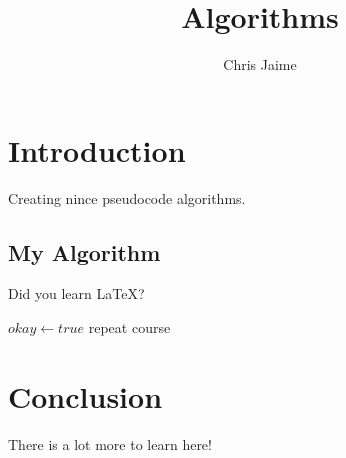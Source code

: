 \documentclass{article}
\title{Algorithms}
\author{Chris Jaime}
\date{}
\begin{document}
\maketitle

\section{Introduction}
Creating nince pseudocode algorithms.

\subsection{My Algorithm}
Did you learn \LaTeX?

\begin{algorithmic}
	\State $okay \gets true$
\Else
		\State repeat course
	\EndWhile
\EndIf	
\end{algorithmic}


\subsection{}

\section{Conclusion}
There is a lot more to learn here!
\end{document}
